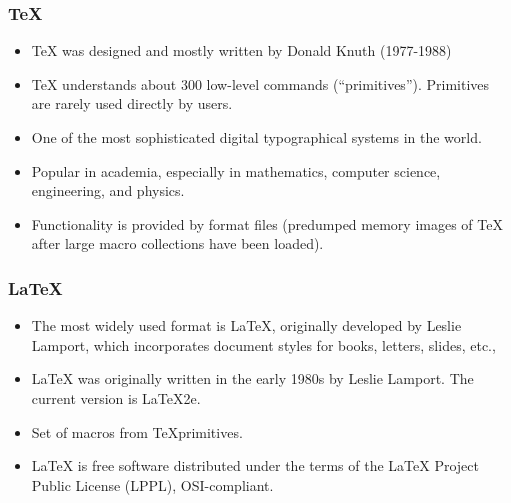 \documentclass{beamer}
\begin{document}

\begin{frame}
\frametitle{\TeX}

\begin{itemize}

\item \TeX{} was designed and mostly written by Donald Knuth (1977-1988)
\item \TeX{} understands about 300 low-level commands (``primitives''). Primitives are rarely used directly by users.
\item One of the most sophisticated digital typographical systems in the world.
\item Popular in academia, especially in mathematics, computer science, engineering, and physics. 
\item Functionality is provided by \alert{format files} (predumped memory images of \TeX{} after large macro collections have been loaded).

\end{itemize}

\end{frame}


\begin{frame}
\frametitle{\LaTeX}

\begin{itemize}

\item The most widely used \alert{format} is \LaTeX, originally developed by Leslie Lamport, which incorporates document styles for books, letters, slides, etc., 
\item \LaTeX{} was originally written in the early 1980s by Leslie Lamport. The current version is \LaTeX2e.
\item Set of macros from \TeX primitives.  
\item \LaTeX{} is free software distributed under the terms of the LaTeX Project Public License (LPPL), OSI-compliant.

\end{itemize}

\end{frame}

\end{document}

